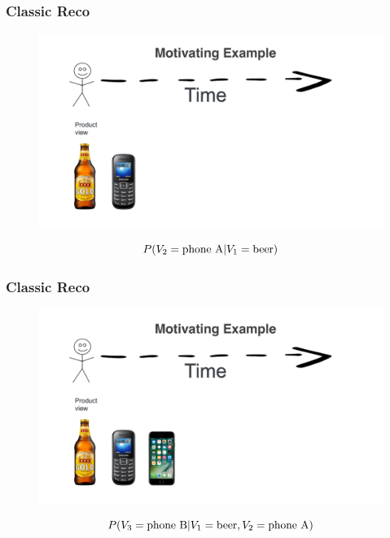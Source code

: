 \begin{frame}
  \frametitle{Classic Reco}
 
 
   \begin{figure}[h!]
     \includegraphics[scale=0.25]{images/mot_ex1b.png}
       \centering
       \label{motex1}
   \end{figure}
   \[
   P(V_2 = {\rm phone ~ A} | V_1 = {\rm beer})  
   \]
     
 \end{frame}


\begin{frame}
  \frametitle{Classic Reco}
 
 
   \begin{figure}[h!]
     \includegraphics[scale=0.25]{images/mot_ex1cc.png}
       \centering
       \label{motex1}
   \end{figure}

   \[
   P(V_3 = {\rm phone ~ B} | V_1 = {\rm beer}, V_2 = {\rm phone ~ A} )  
   \]

   
 \end{frame}



